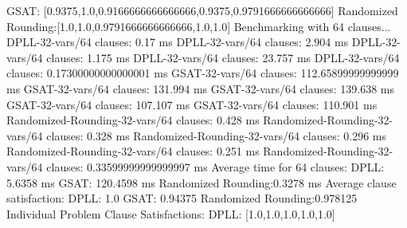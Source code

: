 \documentclass{article}
\begin{document}
  GSAT:               [0.9375,1.0,0.9166666666666666,0.9375,0.9791666666666666]\newline
  Randomized Rounding:[1.0,1.0,0.9791666666666666,1.0,1.0]\newline
\newline
\newline
Benchmarking with 64 clauses...\newline
DPLL-32-vars/64 clauses: 0.17 ms\newline
DPLL-32-vars/64 clauses: 2.904 ms\newline
DPLL-32-vars/64 clauses: 1.175 ms\newline
DPLL-32-vars/64 clauses: 23.757 ms\newline
DPLL-32-vars/64 clauses: 0.17300000000000001 ms\newline
GSAT-32-vars/64 clauses: 112.65899999999999 ms\newline
GSAT-32-vars/64 clauses: 131.994 ms\newline
GSAT-32-vars/64 clauses: 139.638 ms\newline
GSAT-32-vars/64 clauses: 107.107 ms\newline
GSAT-32-vars/64 clauses: 110.901 ms\newline
Randomized-Rounding-32-vars/64 clauses: 0.428 ms\newline
Randomized-Rounding-32-vars/64 clauses: 0.328 ms\newline
Randomized-Rounding-32-vars/64 clauses: 0.296 ms\newline
Randomized-Rounding-32-vars/64 clauses: 0.251 ms\newline
Randomized-Rounding-32-vars/64 clauses: 0.33599999999999997 ms\newline
Average time for 64 clauses:\newline
  DPLL:               5.6358 ms\newline
  GSAT:               120.4598 ms\newline
  Randomized Rounding:0.3278 ms\newline
Average clause satisfaction:\newline
  DPLL:               1.0\newline
  GSAT:               0.94375\newline
  Randomized Rounding:0.978125\newline
\newline
Individual Problem Clause Satisfactions:\newline
  DPLL:               [1.0,1.0,1.0,1.0,1.0]\newline
\end{document}
